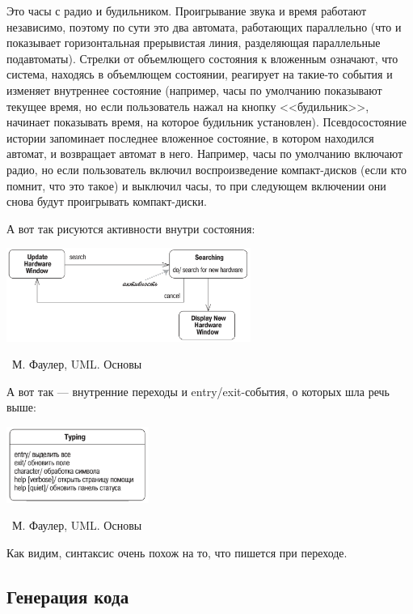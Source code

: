 \documentclass[a5paper]{article}
\newcommand{\attribution}[1] {
    \vspace{-5mm}\begin{flushright}\begin{scriptsize}%
    {\textcopyright\, #1}\end{scriptsize}\end{flushright}
}
\begin{document}
Это часы с радио и будильником. Проигрывание звука и время работают независимо, поэтому по сути это два автомата, работающих параллельно (что и показывает горизонтальная прерывистая линия, разделяющая параллельные подавтоматы). Стрелки от объемлющего состояния к вложенным означают, что система, находясь в объемлющем состоянии, реагирует на такие-то события и изменяет внутреннее состояние (например, часы по умолчанию показывают текущее время, но если пользователь нажал на кнопку <<будильник>>, начинает показывать время, на которое будильник установлен). Псевдосостояние истории запоминает последнее вложенное состояние, в котором находился автомат, и возвращает автомат в него. Например, часы по умолчанию включают радио, но если пользователь включил воспроизведение компакт-дисков (если кто помнит, что это такое) и выключил часы, то при следующем включении они снова будут проигрывать компакт-диски.

А вот так рисуются активности внутри состояния:

\begin{center}
    \includegraphics[width=0.6\textwidth]{stateTransitionInternalEventExample.png}
    \attribution{М. Фаулер, UML. Основы}
\end{center}

А вот так --- внутренние переходы и entry/exit-события, о которых шла речь выше:

\begin{center}
    \includegraphics[width=0.35\textwidth]{stateTransitionInternalEvents.png}
    \attribution{М. Фаулер, UML. Основы}
\end{center}

Как видим, синтаксис очень похож на то, что пишется при переходе.

\subsection{Генерация кода}
\end{document}
